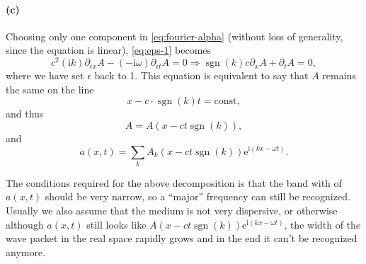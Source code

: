 \documentclass[hyperref, a4paper]{article}
\DeclareMathOperator{\sgn}{sgn}
\newcommand*{\ii}{\mathrm{i}}
\newcommand*{\ee}{\mathrm{e}}
\newcommand*{\const}{\mathrm{const}}
\begin{document}
\paragraph{(c)} Choosing only one component in \eqref{eq:fourier-alpha} 
(without loss of generality, since the equation is linear),
\eqref{eq:eps-1} becomes 
\begin{equation}
    c^2 (\ii k) \partial_{\epsilon x} A - (- \ii \omega) \partial_{\epsilon t} A = 0 
    \Rightarrow \sgn(k) c \partial_x A + \partial_t A = 0,
\end{equation}
where we have set $\epsilon$ back to 1.
This equation is equivalent to say that $A$ remains the same 
on the line 
\begin{equation}
    x - c \cdot \sgn(k) t = \const,
\end{equation}
and thus 
\begin{equation}
    A = A (x - c t \sgn(k)),
\end{equation}
and 
\begin{equation}
    a(x, t) = \sum_k A_k(x - c t \sgn(k)) \ee^{\ii (k x - \omega t)}.
\end{equation}

The conditions required for the above decomposition 
is that the band with of $a(x,  t)$ should be very narrow, 
so a ``major'' frequency can still be recognized.
Usually we also assume that the medium is not very dispersive, 
or otherwise although $a(x, t)$ still looks like 
$A(x - ct \sgn(k)) \ee^{\ii (kx - \omega t)}$,
the width of the wave packet in the real space rapidly grows 
and in the end it can't be recognized anymore.
\end{document}
